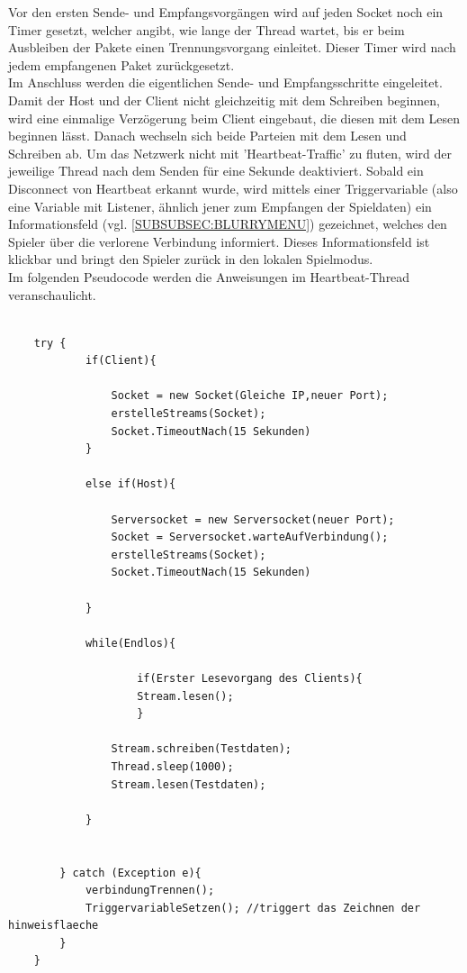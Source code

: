 \documentclass[12pt,a4paper]{article}
\begin{document}
Vor den ersten Sende- und Empfangsvorgängen wird auf jeden Socket noch ein Timer gesetzt, welcher angibt, wie lange der Thread wartet, bis er beim Ausbleiben der Pakete einen Trennungsvorgang einleitet. Dieser Timer wird nach jedem empfangenen Paket zurückgesetzt.\\
Im Anschluss werden die eigentlichen Sende- und Empfangsschritte eingeleitet. Damit der Host und der Client nicht gleichzeitig mit dem Schreiben beginnen, wird eine einmalige Verzögerung beim Client eingebaut, die diesen mit dem Lesen beginnen lässt. Danach wechseln sich beide Parteien mit dem Lesen und Schreiben ab. Um das Netzwerk nicht mit 'Heartbeat-Traffic' zu fluten, wird der jeweilige Thread nach dem Senden für eine Sekunde deaktiviert. Sobald ein Disconnect von Heartbeat erkannt wurde, wird mittels einer Triggervariable (also eine Variable mit Listener, ähnlich jener zum Empfangen der Spieldaten) ein Informationsfeld (vgl. \ref{SUBSUBSEC:BLURRYMENU}) gezeichnet, welches den Spieler über die verlorene Verbindung informiert. Dieses Informationsfeld ist klickbar und bringt den Spieler zurück in den lokalen Spielmodus.\\[2ex]
Im folgenden Pseudocode werden die Anweisungen im Heartbeat-Thread veranschaulicht.

\lstset{language=java}
\begin{lstlisting}

	try {
			if(Client){
	
				Socket = new Socket(Gleiche IP,neuer Port);
				erstelleStreams(Socket);
				Socket.TimeoutNach(15 Sekunden)
			}

			else if(Host){

				Serversocket = new Serversocket(neuer Port);
				Socket = Serversocket.warteAufVerbindung();
				erstelleStreams(Socket);
				Socket.TimeoutNach(15 Sekunden)

			}
			
			while(Endlos){

					if(Erster Lesevorgang des Clients){					
					Stream.lesen();
					}

				Stream.schreiben(Testdaten);
				Thread.sleep(1000);
				Stream.lesen(Testdaten);

			}


		} catch (Exception e){
			verbindungTrennen();
			TriggervariableSetzen(); //triggert das Zeichnen der hinweisflaeche
		}
	}
\end{lstlisting}




\newpage
\end{document}
